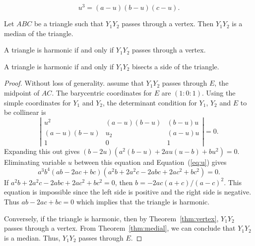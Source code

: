 \documentclass[10pt,a4paper]{amsart}
\begin{document}
\begin{equation}
\label{eq:u}
u^3=(a-u)(b-u)(c-u).
\end{equation}

\begin{theorem}
\label{thm:medial}
Let $ABC$ be a triangle such that $Y_1Y_2$ passes through a vertex.
Then $Y_1Y_2$ is a median of the triangle.
\end{theorem}

\begin{theorem}
\label{thm:vertex}
A triangle is harmonic if and only if $Y_1Y_2$ passes through a vertex.
\end{theorem}

\begin{theorem}
A triangle is harmonic if and only if $Y_1Y_2$ bisects a side of the triangle.
\end{theorem}

\begin{proof}
Without loss of generality.
assume that $Y_1Y_2$ passes through $E$, the midpoint of $AC$.
The barycentric coordinates for $E$ are  $(1:0:1)$.
Using the simple coordinates for $Y_1$ and $Y_2$,
the determinant condition for $Y_1$, $Y_2$ and $E$ to be collinear is
$$\left|
\begin{array}{ccc}
u^2&(a-u)(b-u)&(b-u)u\\
(a-u)(b-u)&u_2&(a-u)u\\
1&0&1
\end{array}
\right|=0.$$
Expanding this out gives $(b-2 u)(a^2 (b-u)+2 a u (u-b)+b u^2)=0$.
Eliminating variable $u$ between this equation and 
Equation~(\ref{eq:u}) gives
\begin{equation}
a^3 b^4 (a b - 2 a c + b c) (a^2 b + 2 a^2 c - 2 a b c + 2 a c^2 + b c^2) = 0.
\end{equation}
If $a^2 b + 2 a^2 c - 2 a b c + 2 a c^2 + b c^2 = 0$, then
$b= -2ac (a+c)/(a-c)^2$.
This equation is impossible since the left side is positive and the right side is negative.
Thus $a b - 2 a c + b c=0$ which implies that  the triangle is harmonic.

Conversely, if the triangle is harmonic, then by Theorem~\ref{thm:vertex}, $Y_1Y_2$
passes through a vertex. From Theorem~\ref{thm:medial}, we can conclude that $Y_1Y_2$ is a median.
Thus, $Y_1Y_2$ passes through $E$.
\end{proof}
\end{document}
